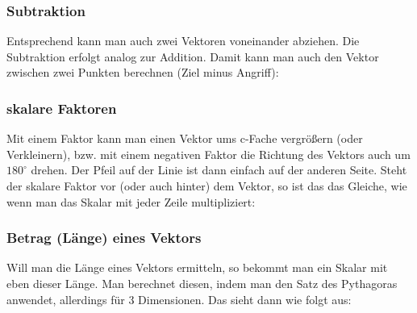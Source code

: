 	\subsubsection{Subtraktion}
		Entsprechend kann man auch zwei Vektoren voneinander abziehen. Die Subtraktion
		erfolgt analog zur Addition. Damit kann man auch den Vektor zwischen zwei
		Punkten berechnen (Ziel minus Angriff):
		\formel{
			\[\vec{a}-\vec{b}=\begin{pmatrix}
			 a_1-b_1\\
			 a_2-b_2\\
			 a_3-b_3
			\end{pmatrix}\]
		}

	\subsubsection{skalare Faktoren}
		Mit einem Faktor kann man einen Vektor ums c-Fache vergrößern (oder
		Verkleinern), bzw. mit einem negativen Faktor die Richtung des Vektors auch um
		\(180^{\circ}\) drehen. Der Pfeil auf der Linie ist dann einfach auf der
		anderen Seite. Steht der skalare Faktor vor (oder auch hinter) dem Vektor, so
		ist das das Gleiche, wie wenn man das Skalar mit jeder Zeile multipliziert:
		\formel{
			\[c\cdot \vec{a}=
			\begin{pmatrix}
			 c\cdot a_1\\
			 c\cdot a_2\\
			 c\cdot a_3
			\end{pmatrix}
			\]
		}
	
	\subsubsection{Betrag (Länge) eines Vektors}
		Will man die Länge eines Vektors ermitteln, so bekommt man ein Skalar mit eben
		dieser Länge. Man berechnet diesen, indem man den Satz des Pythagoras
		anwendet, allerdings für 3 Dimensionen. Das sieht dann wie folgt aus:
		\formel{\[|\vec{a}|=\sqrt{a_1^2+a_2^2+a_3^2}\]}
	
